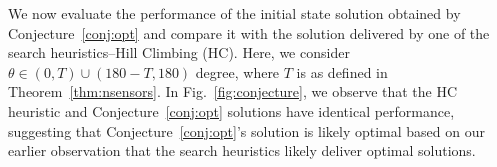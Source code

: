 



We now evaluate the performance of the initial state solution obtained by Conjecture~\ref{conj:opt} and compare it with the solution delivered by 
one of the search heuristics--Hill Climbing (HC).
Here, we consider $\theta \in (0, T) \cup (180-T, 180)$ degree, where $T$ is 
as defined in Theorem~\ref{thm:nsensors}.
In Fig.~\ref{fig:conjecture}, we observe that the HC heuristic and Conjecture~\ref{conj:opt} solutions have identical performance, suggesting that
Conjecture~\ref{conj:opt}'s solution is likely optimal based on our earlier observation
that the search heuristics likely deliver optimal solutions.




